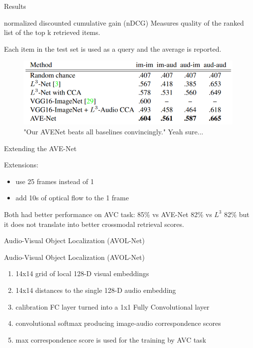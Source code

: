 \documentclass{beamer}
\begin{document}
\begin{frame}{Results}
\begin{block}{normalized discounted cumulative gain (nDCG)}
Measures quality of the ranked list of the top k retrieved items.
\end{block}

Each item in the test set is used as a query and the average  is reported.

\begin{figure}[h]
\includegraphics[width=\textwidth]{img/results}
\caption{"Our AVENet
beats all baselines convincingly." \cite{cit:ots} Yeah sure...}
\end{figure}

\end{frame}
\begin{frame}{Extending the AVE-Net}

Extensions:
\begin{itemize}
\item use 25 frames instead of 1
\item add 10s of optical flow to the 1 frame
\end{itemize}

\vfill

Both had better performance on AVC task: 85\% vs AVE-Net 82\% vs $L^3$ 82\% but it does not translate into better crossmodal retrieval scores.

\end{frame}
\begin{frame}{Audio-Visual Object Localization (AVOL-Net)}


\end{frame}
\begin{frame}{Audio-Visual Object Localization (AVOL-Net)}
\begin{enumerate}
\item 14x14 grid of local 128-D visual embeddings
\item 14x14 distances to the single 128-D audio embedding
\item calibration FC layer turned into a 1x1 Fully Convolutional layer
\item convolutional softmax producing image-audio correspondence scores
\item max correspondence score is used for the training by AVC task
\end{enumerate}
\end{frame}
\end{document}
